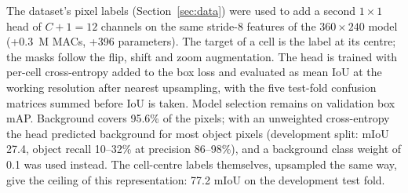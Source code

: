 \documentclass[11pt,a4paper]{article}
\begin{document}
The dataset's pixel labels (Section~\ref{sec:data}) were used to add a
second $1 \times 1$ head of $C + 1 = 12$ channels on the same stride-8
features of the $360 \times 240$ model (+0.3~M MACs, +396 parameters). The
target of a cell is the label at its centre; the masks follow the flip,
shift and zoom augmentation. The head is trained with per-cell
cross-entropy added to the box loss and evaluated as mean IoU at the
working resolution after nearest upsampling, with the five test-fold
confusion matrices summed before IoU is taken. Model selection remains on
validation box mAP. Background covers 95.6\% of the pixels; with an
unweighted cross-entropy the head predicted background for most object
pixels (development split: mIoU 27.4, object recall 10--32\% at precision
86--98\%), and a background class weight of 0.1 was used instead. The
cell-centre labels themselves, upsampled the same way, give the ceiling of
this representation: 77.2 mIoU on the development test fold.
\end{document}
